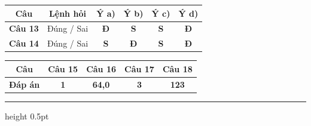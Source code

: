 \documentclass[11pt,a4paper]{article}
\begin{document}
\vspace{3pt}
\begin{center}
\renewcommand{\arraystretch}{1.2}
\begin{tabular}{|c|c|c|c|c|c|}
\hline
\rowcolor{tableGreen}
\textbf{Câu} & \textbf{Lệnh hỏi} & \textbf{Ý a)} & \textbf{Ý b)} & \textbf{Ý c)} & \textbf{Ý d)} \\
\hline
\textbf{Câu 13} & Đúng / Sai & \textbf{\color{hfRed}Đ} & \textbf{S} & \textbf{S} & \textbf{\color{hfRed}Đ} \\
\hline
\textbf{Câu 14} & Đúng / Sai & \textbf{S} & \textbf{\color{hfRed}Đ} & \textbf{S} & \textbf{\color{hfRed}Đ} \\
\hline
\end{tabular}
\end{center}

\vspace{3pt}
\begin{center}
\renewcommand{\arraystretch}{1.2}
\begin{tabular}{|c|c|c|c|c|}
\hline
\rowcolor{tableGreen}
\textbf{Câu} & \textbf{Câu 15} & \textbf{Câu 16} & \textbf{Câu 17} & \textbf{Câu 18} \\
\hline
\textbf{Đáp án} & \textbf{\color{hfRed}1} & \textbf{\color{hfRed}64,0} & \textbf{\color{hfRed}3} & \textbf{\color{hfRed}123} \\
\hline
\end{tabular}
\end{center}
\vspace{6pt}
\hrule height 0.5pt
\vspace{6pt}

\vspace{4pt}
\end{document}
